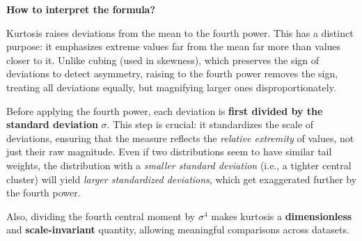 \documentclass[twoside]{book}
\begin{document}
\begin{center}
\end{center}


\textbf{How to interpret the formula?}

Kurtosis raises deviations from the mean to the fourth power. This has a distinct purpose: it emphasizes extreme values far from the mean far more than values closer to it. Unlike cubing (used in skewness), which preserves the sign of deviations to detect asymmetry, raising to the fourth power removes the sign, treating all deviations equally, but magnifying larger ones disproportionately.

Before applying the fourth power, each deviation is \textbf{first divided by the standard deviation} $\sigma$. This step is crucial: it standardizes the scale of deviations, ensuring that the measure reflects the \textit{relative extremity} of values, not just their raw magnitude. Even if two distributions seem to have similar tail weights, the distribution with a \textit{smaller standard deviation} (i.e., a tighter central cluster) will yield \textit{larger standardized deviations}, which get exaggerated further by the fourth power.

Also, dividing the fourth central moment by $\sigma^4$ makes kurtosis a \textbf{dimensionless} and \textbf{scale-invariant} quantity, allowing meaningful comparisons across datasets.
\end{document}
